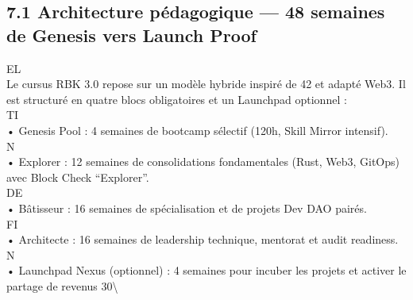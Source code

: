 \subsection{7.1 Architecture pédagogique — 48 semaines de Genesis vers Launch Proof}
\vspace{0.5em}
\vspace{0.5em}
\vspace{0.5em}
\vspace{0.5em}
EL\\
Le cursus RBK 3.0 repose sur un modèle hybride inspiré de 42 et adapté Web3. Il est structuré en quatre blocs obligatoires et un Launchpad optionnel :\\
\vspace{0.5em}
\vspace{0.5em}
\vspace{0.5em}
\vspace{0.5em}
TI\\
• Genesis Pool : 4 semaines de bootcamp sélectif (120h, Skill Mirror intensif).\\
\vspace{0.5em}
\vspace{0.5em}
\vspace{0.5em}
\vspace{0.5em}
N\\
• Explorer : 12 semaines de consolidations fondamentales (Rust, Web3, GitOps) avec Block Check “Explorer”.\\
\vspace{0.5em}
\vspace{0.5em}
\vspace{0.5em}
\vspace{0.5em}
DE\\
• Bâtisseur : 16 semaines de spécialisation et de projets Dev DAO pairés.\\
\vspace{0.5em}
\vspace{0.5em}
\vspace{0.5em}
\vspace{0.5em}
FI\\
• Architecte : 16 semaines de leadership technique, mentorat et audit readiness.\\
\vspace{0.5em}
\vspace{0.5em}
\vspace{0.5em}
N\\
• Launchpad Nexus (optionnel) : 4 semaines pour incuber les projets et activer le partage de revenus 30\textbackslash{}%

